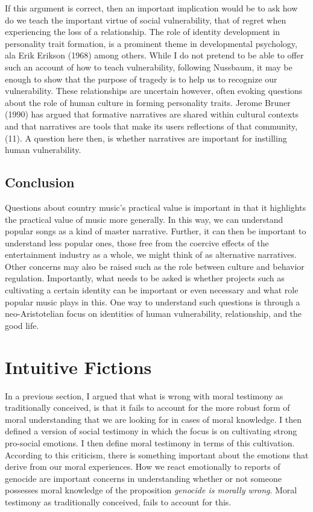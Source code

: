 \documentclass[12pt]{book}
\theoremstyle{definition}
\theoremstyle{remark}
\begin{document}
If this argument is correct, then an important implication would be to ask how do we teach the important virtue of social vulnerability, that of regret when experiencing the loss of a relationship. The role of identity development in personality trait formation, is a prominent theme in developmental psychology, ala Erik Erikson (1968) among others. While I do not pretend to be able to offer such an account of how to teach vulnerability, following Nussbaum, it may be enough to show that the purpose of tragedy is to help us to recognize our vulnerability. These relationships are uncertain however, often evoking questions about the role of human culture in forming personality traits. Jerome Bruner (1990) has argued that formative narratives are shared within cultural contexts and that narratives are tools that make its users reflections of that community, (11). A question here then, is whether narratives are important for instilling human vulnerability.

\section{Conclusion}\label{conclusion}

Questions about country music's practical value is important in that it highlights the practical value of music more generally. In this way, we can understand popular songs as a kind of master narrative. Further, it can then be important to understand less popular ones, those free from the coercive effects of the entertainment industry as a whole, we might think of as alternative narratives. Other concerns may also be raised such as the role between culture and behavior regulation. Importantly, what needs to be asked is whether projects such as cultivating a certain identity can be important or even necessary and what role popular music plays in this. One way to understand such questions is through a neo-Aristotelian focus on identities of human vulnerability, relationship, and the good life.

\chapter{Intuitive Fictions}\label{intuitive-fictions}

In a previous section, I argued that what is wrong with moral testimony as traditionally conceived, is that it fails to account for the more robust form of moral understanding that we are looking for in cases of moral knowledge. I then defined a version of social testimony in which the focus is on cultivating strong pro-social emotions. I then define moral testimony in terms of this cultivation. According to this criticism, there is something important about the emotions that derive from our moral experiences. How we react emotionally to reports of genocide are important concerns in understanding whether or not someone possesses moral knowledge of the proposition \emph{genocide is morally wrong}. Moral testimony as traditionally conceived, fails to account for this.
\end{document}
